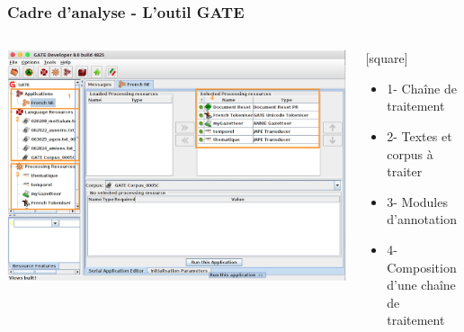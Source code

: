 \documentclass[10pt, compress]{beamer}
\begin{document}
\begin{frame}[fragile]
\frametitle{Cadre d'analyse - L'outil GATE}
\begin{columns}
	\includegraphics[scale=0.2]{img/gateMod.png} 
	\onslide<1>
	\begin{scriptsize}
		[square]
	\begin{itemize}	
		\item{1- Chaîne de traitement}
		\item{2- Textes et corpus à traiter}
		\item{3- Modules d'annotation}
		\item{4- Composition d'une chaîne de traitement}
	\end{itemize}
	\end{scriptsize}
\end{columns}
\end{frame}
\end{document}
